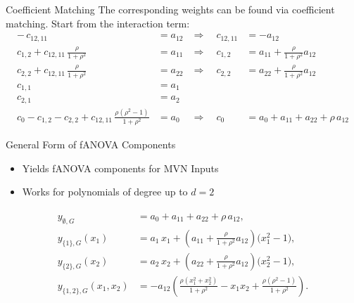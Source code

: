 \begin{frame}{Coefficient Matching}
  The corresponding weights can be found via coefficient matching. Start from the interaction term:
      \begin{align*}
-\,c_{12, 11} &= a_{12} &\Rightarrow\quad c_{12, 11} &= -a_{12} \\[0.5em]
c_{1,2} + c_{12, 11}\,\tfrac{\rho}{1+\rho^2} &= a_{11} 
&\Rightarrow\quad c_{1,2} &= a_{11} + \tfrac{\rho}{1+\rho^2}a_{12} \\[0.5em]
c_{2,2} + c_{12, 11}\,\tfrac{\rho}{1+\rho^2} &= a_{22} 
&\Rightarrow\quad c_{2,2} &= a_{22} + \tfrac{\rho}{1+\rho^2}a_{12} \\[0.5em]
c_{1,1} &= a_1 \\[0.5em]
c_{2,1} &= a_2 \\[0.5em]
c_0 - c_{1,2} - c_{2,2} + c_{12, 11}\,\tfrac{\rho(\rho^2 - 1)}{1+\rho^2} &= a_0 
&\Rightarrow\quad 
c_0 &= a_0 + a_{11} + a_{22} + \rho\,a_{12}
\end{align*}
\end{frame}

\begin{frame}{General Form of fANOVA Components}
  \begin{itemize}
    \item Yields fANOVA components for MVN Inputs
    \item Works for polynomials of degree up to $d = 2$
  \end{itemize}
  \begin{align}
\begin{split}
y_{\emptyset, G} &= a_0 + a_{11} + a_{22} + \rho\,a_{12}, \\[0.5em]
y_{\{1\}, G}(x_1) &= a_1\,x_1 
  + \left(a_{11} + \frac{\rho}{1+\rho^2}a_{12}\right)\bigl(x_1^2 - 1\bigr), \\[0.5em]
y_{\{2\}, G}(x_2) &= a_2\,x_2 
  + \left(a_{22} + \frac{\rho}{1+\rho^2}a_{12}\right)\bigl(x_2^2 - 1\bigr), \\[0.5em]
y_{\{1,2\}, G}(x_1,x_2) 
&= -a_{12}\!\left(
    \frac{\rho(x_1^2+x_2^2)}{1+\rho^2} 
    - x_1 x_2 
    + \frac{\rho(\rho^2-1)}{1+\rho^2}
   \right).
\end{split}
\label{eq:fanova_components_2D_polynomial}
\end{align}
\end{frame}
  

